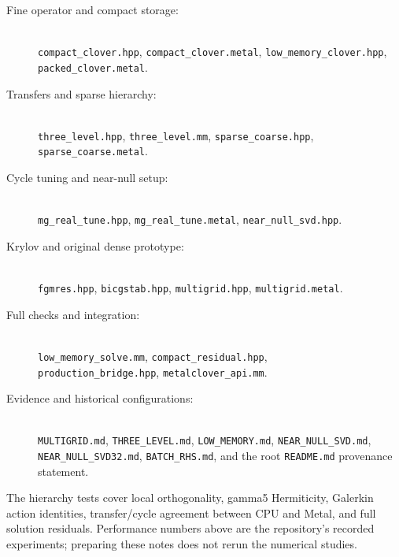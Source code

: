 \documentclass[11pt]{article}
\newcommand{\file}[1]{\nolinkurl{#1}}
\begin{document}
\begin{description}
 \item[Fine operator and compact storage:]\hfill\\
 \file{compact_clover.hpp}, \file{compact_clover.metal},
 \file{low_memory_clover.hpp}, \file{packed_clover.metal}.
 \item[Transfers and sparse hierarchy:]\hfill\\
 \file{three_level.hpp}, \file{three_level.mm},
 \file{sparse_coarse.hpp}, \file{sparse_coarse.metal}.
 \item[Cycle tuning and near-null setup:]\hfill\\
 \file{mg_real_tune.hpp}, \file{mg_real_tune.metal},
 \file{near_null_svd.hpp}.
 \item[Krylov and original dense prototype:]\hfill\\
 \file{fgmres.hpp}, \file{bicgstab.hpp},
 \file{multigrid.hpp}, \file{multigrid.metal}.
 \item[Full checks and integration:]\hfill\\
 \file{low_memory_solve.mm}, \file{compact_residual.hpp},\\
 \file{production_bridge.hpp}, \file{metalclover_api.mm}.
 \item[Evidence and historical configurations:]\hfill\\
 \file{MULTIGRID.md}, \file{THREE_LEVEL.md}, \file{LOW_MEMORY.md},
 \file{NEAR_NULL_SVD.md}, \file{NEAR_NULL_SVD32.md},
 \file{BATCH_RHS.md}, and the root \file{README.md} provenance statement.
\end{description}
The hierarchy tests cover local orthogonality, gamma5 Hermiticity, Galerkin
action identities, transfer/cycle agreement between CPU and Metal, and full
solution residuals. Performance numbers above are the repository's recorded
experiments; preparing these notes does not rerun the numerical studies.
\end{document}
